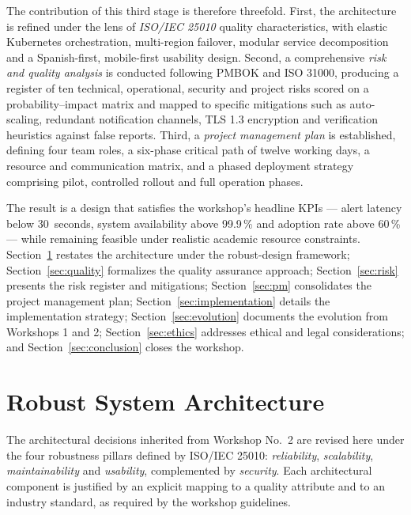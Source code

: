 \documentclass[conference,a4paper,10pt]{IEEEtran}
\begin{document}
The contribution of this third stage is therefore threefold. First, the
architecture is refined under the lens of \emph{ISO/IEC 25010} quality
characteristics, with elastic Kubernetes orchestration, multi-region failover,
modular service decomposition and a Spanish-first, mobile-first usability
design. Second, a comprehensive \emph{risk and quality analysis} is conducted
following PMBOK and ISO 31000, producing a register of ten technical,
operational, security and project risks scored on a probability--impact matrix
and mapped to specific mitigations such as auto-scaling, redundant notification
channels, TLS 1.3 encryption and verification heuristics against false
reports. Third, a \emph{project management plan} is established, defining four
team roles, a six-phase critical path of twelve working days, a resource and
communication matrix, and a phased deployment strategy comprising pilot,
controlled rollout and full operation phases.

The result is a design that satisfies the workshop's headline KPIs --- alert
latency below 30~seconds, system availability above 99.9\,\% and adoption rate
above 60\,\% --- while remaining feasible under realistic academic resource
constraints. Section~\ref{sec:architecture} restates the architecture under the
robust-design framework; Section~\ref{sec:quality} formalizes the quality
assurance approach; Section~\ref{sec:risk} presents the risk register and
mitigations; Section~\ref{sec:pm} consolidates the project management plan;
Section~\ref{sec:implementation} details the implementation strategy;
Section~\ref{sec:evolution} documents the evolution from Workshops 1 and 2;
Section~\ref{sec:ethics} addresses ethical and legal considerations; and
Section~\ref{sec:conclusion} closes the workshop.

\section{Robust System Architecture}
\label{sec:architecture}

The architectural decisions inherited from Workshop No.\ 2 are revised here
under the four robustness pillars defined by ISO/IEC 25010: \emph{reliability},
\emph{scalability}, \emph{maintainability} and \emph{usability}, complemented
by \emph{security}. Each architectural component is justified by an explicit
mapping to a quality attribute and to an industry standard, as required by the
workshop guidelines.
\end{document}
